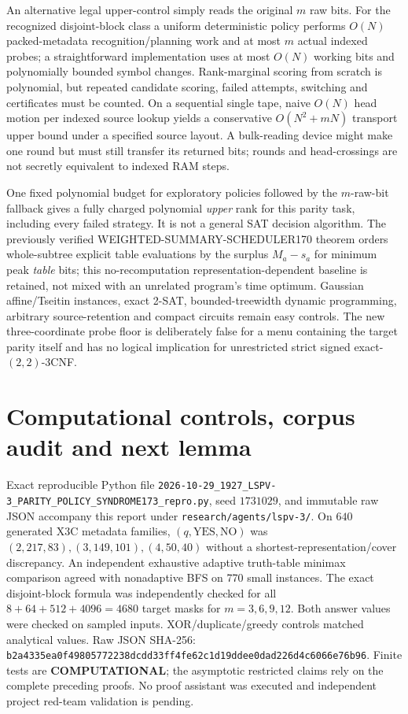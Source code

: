\documentclass{article}
\begin{document}
An alternative legal upper-control simply reads the original $m$ raw bits. For the recognized disjoint-block class a uniform deterministic policy performs $O(N)$ packed-metadata recognition/planning work and at most $m$ actual indexed probes; a straightforward implementation uses at most $O(N)$ working bits and polynomially bounded symbol changes. Rank-marginal scoring from scratch is polynomial, but repeated candidate scoring, failed attempts, switching and certificates must be counted. On a sequential single tape, naive $O(N)$ head motion per indexed source lookup yields a conservative $O(N^2+mN)$ transport upper bound under a specified source layout. A bulk-reading device might make one round but must still transfer its returned bits; rounds and head-crossings are not secretly equivalent to indexed RAM steps.

One fixed polynomial budget for exploratory policies followed by the $m$-raw-bit fallback gives a fully charged polynomial \emph{upper} rank for this parity task, including every failed strategy. It is not a general SAT decision algorithm. The previously verified WEIGHTED-SUMMARY-SCHEDULER170 theorem orders whole-subtree explicit table evaluations by the surplus $M_a-s_a$ for minimum peak \emph{table} bits; this no-recomputation representation-dependent baseline is retained, not mixed with an unrelated program's time optimum. Gaussian affine/Tseitin instances, exact 2-SAT, bounded-treewidth dynamic programming, arbitrary source-retention and compact circuits remain easy controls. The new three-coordinate probe floor is deliberately false for a menu containing the target parity itself and has no logical implication for unrestricted strict signed exact-$(2,2)$-3CNF.

\section{Computational controls, corpus audit and next lemma}
Exact reproducible Python file \texttt{2026-10-29\_1927\_LSPV-3\_PARITY\_POLICY\_SYNDROME173\_repro.py}, seed $1731029$, and immutable raw JSON accompany this report under \texttt{research/agents/lspv-3/}. On $640$ generated X3C metadata families, $(q,\mathrm{YES},\mathrm{NO})$ was $(2,217,83),(3,149,101),(4,50,40)$ without a shortest-representation/cover discrepancy. An independent exhaustive adaptive truth-table minimax comparison agreed with nonadaptive BFS on 770 small instances. The exact disjoint-block formula was independently checked for all $8+64+512+4096=4680$ target masks for $m=3,6,9,12$. Both answer values were checked on sampled inputs. XOR/duplicate/greedy controls matched analytical values. Raw JSON SHA-256:
\texttt{b2a4335ea0f49805772238dcdd33ff4fe62c1d19ddee0dad226d4c6066e76b96}.
Finite tests are \textbf{COMPUTATIONAL}; the asymptotic restricted claims rely on the complete preceding proofs. No proof assistant was executed and independent project red-team validation is pending.
\end{document}
